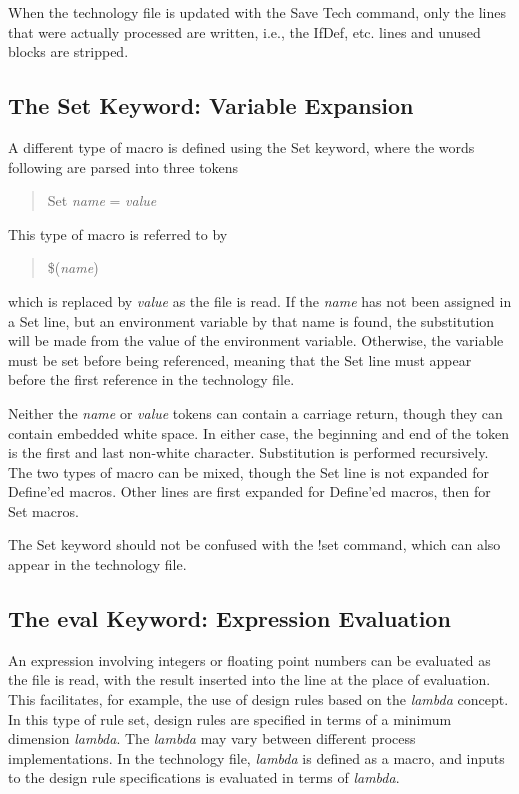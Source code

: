 When the technology file is updated with the {\cb Save Tech} command,
only the lines that were actually processed are written, i.e., the
{\vt IfDef}, etc.  lines and unused blocks are stripped.

\subsection{The {\vt Set} Keyword: Variable Expansion}

A different type of macro is defined using the {\vt Set} keyword,
where the words following are parsed into three tokens
\begin{quote}
{\vt Set} {\it name\/} {\vt =} {\it value\/}
\end{quote}

This type of macro is referred to by
\begin{quote}
{\vt \$({\it name\/})}
\end{quote}

which is replaced by {\it value\/} as the file is read.  If the {\it
name} has not been assigned in a {\vt Set} line, but an environment
variable by that name is found, the substitution will be made from the
value of the environment variable.  Otherwise, the variable must be
set before being referenced, meaning that the {\vt Set} line must
appear before the first reference in the technology file.

Neither the {\it name\/} or {\it value\/} tokens can contain a
carriage return, though they can contain embedded white space.  In
either case, the beginning and end of the token is the first and last
non-white character.  Substitution is performed recursively.  The two
types of macro can be mixed, though the {\vt Set} line is not expanded
for {\vt Define}'ed macros.  Other lines are first expanded for {\vt
Define}'ed macros, then for {\vt Set} macros.

The {\vt Set} keyword should not be confused with the {\cb !set}
command, which can also appear in the technology file.

\subsection{The {\vt eval} Keyword: Expression Evaluation}

An expression involving integers or floating point numbers can be
evaluated as the file is read, with the result inserted into the line
at the place of evaluation.  This facilitates, for example, the use of
design rules based on the {\it lambda} concept.  In this type of rule
set, design rules are specified in terms of a minimum dimension {\it
lambda\/}.  The {\it lambda\/} may vary between different process
implementations.  In the technology file, {\it lambda\/} is defined as
a macro, and inputs to the design rule specifications is evaluated in
terms of {\it lambda\/}.


